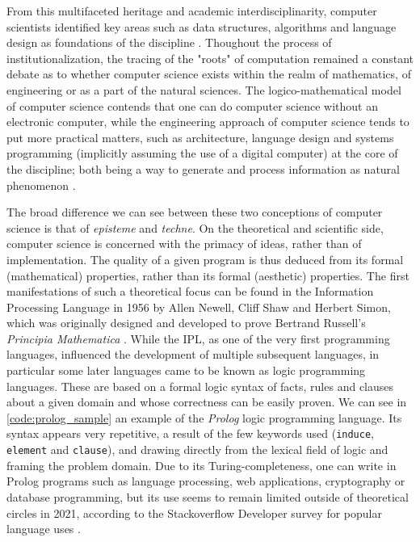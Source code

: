 From this multifaceted heritage and academic interdisciplinarity, computer scientists identified key areas such as data structures, algorithms and language design as foundations of the discipline \citep{wirth_algorithms_1976}. Thoughout the process of institutionalization, the tracing of the "roots" of computation remained a constant debate as to whether computer science exists within the realm of mathematics, of engineering or as a part of the natural sciences. The logico-mathematical model of computer science contends that one can do computer science without an electronic computer, while the engineering approach of computer science tends to put more practical matters, such as architecture, language design and systems programming (implicitly assuming the use of a digital computer) at the core of the discipline; both being a way to generate and process information as natural phenomenon \citep{tedre_development_2006}.

The broad difference we can see between these two conceptions of computer science is that of \emph{episteme} and \emph{techne}. On the theoretical and scientific side, computer science is concerned with the primacy of ideas, rather than of implementation. The quality of a given program is thus deduced from its formal (mathematical) properties, rather than its formal (aesthetic) properties. The first manifestations of such a theoretical focus can be found in the Information Processing Language in 1956 by Allen Newell, Cliff Shaw and Herbert Simon, which was originally designed and developed to prove Bertrand Russell's \emph{Principia Mathematica} \citep{ifrah_universal_2001}. While the IPL, as one of the very first programming languages, influenced the development of multiple subsequent languages, in particular some later languages came to be known as logic programming languages. These are based on a formal logic syntax of facts, rules and clauses about a given domain and whose correctness can be easily proven. We can see in \autoref{code:prolog_sample} an example of the \emph{Prolog} logic programming language. Its syntax appears very repetitive, a result of the few keywords used (\lstinline{induce}, \lstinline{element} and \lstinline{clause}), and drawing directly from the lexical field of logic and framing the problem domain. Due to its Turing-completeness, one can write in Prolog programs such as language processing, web applications, cryptography or database programming, but its use seems to remain limited outside of theoretical circles in 2021, according to the Stackoverflow Developer survey for popular language uses \citep{stackoverflow_stack_2021}.

